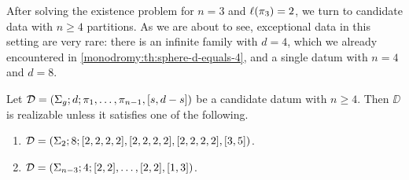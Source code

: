 After solving the existence problem for $n=3$ and $\ell(\pi_3)=2$, we turn to candidate data with $n\ge 4$ partitions. As we are about to see, exceptional data in this setting are very rare: there is an infinite family with $d=4$, which we already encountered in \cref{monodromy:th:sphere-d-equals-4}, and a single datum with $n=4$ and $d=8$.

\begin{theorem}\label{short-partition:th:realizability-on-higher-genus-n-ge-4}
Let $\mathcal{D}=(\Sigma_{g};d;\pi_1,\ldots,\pi_{n-1},[s,d-s])$ be a candidate datum with $n\ge 4$. Then $\DD$ is realizable unless it satisfies one of the following.
\begin{enumerate}[(1)]
\item $\mathcal{D}=(\Sigma_{2};8;[2,2,2,2],[2,2,2,2],[2,2,2,2],[3,5])$.
\item $\mathcal{D}=(\Sigma_{n-3};4;[2,2],\ldots,[2,2],[1,3])$.
\end{enumerate}
\end{theorem}
